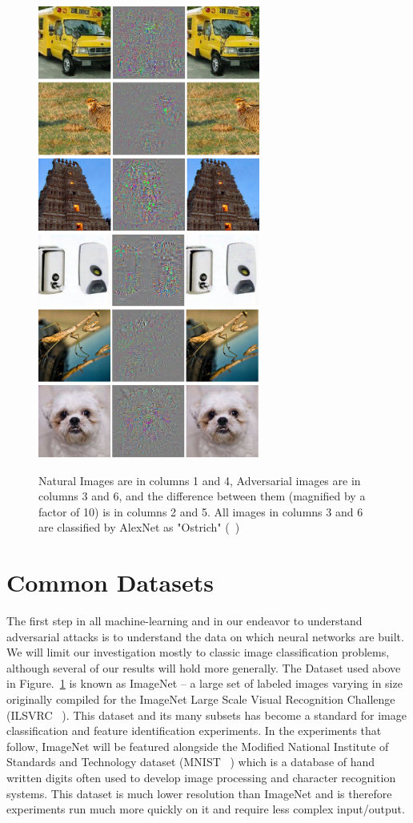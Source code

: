 \begin{figure}[H]
    \centering
\includegraphics[width=7.3cm]{c1_figures/negative1.png}\includegraphics[width=7.3cm]{c1_figures/negative2.png}
    \caption{Natural Images are in columns 1 and 4, Adversarial images are in columns 3 and 6, and the difference between them (magnified by a factor of 10) is in columns 2 and 5. All images in columns 3 and 6 are classified by AlexNet as "Ostrich" (~\cite{Szegedy2013})}
    \label{fig:szegedy}
\end{figure}

\section{Common Datasets}

The first step in all machine-learning and in our endeavor to
understand adversarial attacks is to understand the data on which
neural networks are built. We will limit our investigation mostly to
classic image classification problems, although several of our results
will hold more generally. The Dataset used above in
Figure.~\ref{fig:szegedy} is known as ImageNet -- a large set of
labeled images varying in size originally compiled for the ImageNet
Large Scale Visual Recognition Challenge (ILSVRC ~\cite{ilvsrc}). This
dataset and its many subsets has become a standard for image
classification and feature identification experiments. In the
experiments that follow, ImageNet will be featured alongside the
Modified National Institute of Standards and Technology dataset (MNIST ~\cite{}) which is a database of hand written digits often used to develop image processing and character recognition systems. This dataset is much lower resolution than ImageNet and is therefore experiments run much more quickly on it and require less complex input/output.  

